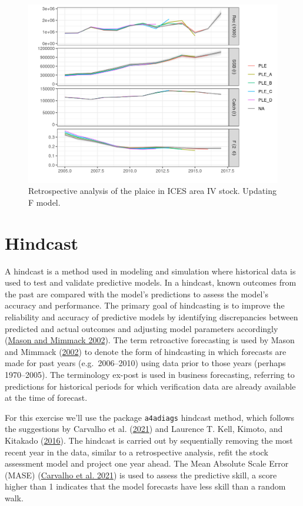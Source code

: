 \documentclass[
]{book}
\begin{document}
\begin{figure}
\centering
\includegraphics{_bookdown_files/_main_files/figure-html/retro2-1.png}
\caption{\label{fig:retro2}Retrospective analysis of the plaice in ICES area IV stock. Updating F model.}
\end{figure}

\hypertarget{hindcast}{%
\section{Hindcast}\label{hindcast}}

A hindcast is a method used in modeling and simulation where historical data is used to test and validate predictive models. In a hindcast, known outcomes from the past are compared with the model's predictions to assess the model's accuracy and performance. The primary goal of hindcasting is to improve the reliability and accuracy of predictive models by identifying discrepancies between predicted and actual outcomes and adjusting model parameters accordingly (\protect\hyperlink{ref-hc2002}{Mason and Mimmack 2002}). The term retroactive forecasting is used by Mason and Mimmack (\protect\hyperlink{ref-hc2002}{2002}) to denote the form of hindcasting in which forecasts are made for past years (e.g.~2006--2010) using data prior to those years (perhaps 1970--2005). The terminology ex-post is used in business forecasting, referring to predictions for historical periods for which verification data are already available at the time of forecast.

For this exercise we'll use the package \texttt{a4adiags} hindcast method, which follows the suggestions by Carvalho et al. (\protect\hyperlink{ref-cookbook2021}{2021}) and Laurence T. Kell, Kimoto, and Kitakado (\protect\hyperlink{ref-KELL2016119}{2016}). The hindcast is carried out by sequentially removing the most recent year in the data, similar to a retrospective analysis, refit the stock assessment model and project one year ahead. The Mean Absolute Scale Error (MASE) (\protect\hyperlink{ref-cookbook2021}{Carvalho et al. 2021}) is used to assess the predictive skill, a score higher than 1 indicates that the model forecasts have less skill than a random walk.
\end{document}
